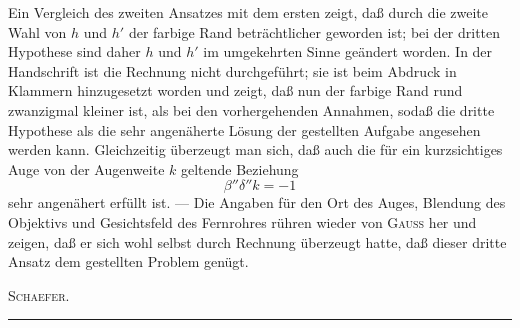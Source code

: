 Ein Vergleich des zweiten Ansatzes mit dem ersten zeigt, daß durch die zweite Wahl von $h$ und $h'$ der farbige Rand beträchtlicher geworden ist; bei der dritten Hypothese sind daher $h$ und $h'$ im umgekehrten Sinne geändert worden. In der Handschrift ist die Rechnung nicht durchgeführt; sie ist beim Abdruck in Klammern hinzugesetzt worden und zeigt, daß nun der farbige Rand rund zwanzigmal kleiner ist, als bei den vorhergehenden Annahmen, sodaß die dritte Hypothese als die sehr angenäherte Lösung der gestellten Aufgabe angesehen werden kann. Gleichzeitig überzeugt man sich, daß auch die für ein kurzsichtiges Auge von der Augenweite $k$ geltende Beziehung
\[
\beta''\delta''k=-1
\]
\noindent sehr angenähert erfüllt ist. — Die Angaben für den Ort des Auges, Blendung des Objektivs und Gesichtsfeld des Fernrohres rühren wieder von \textsc{Gauss} her und zeigen, daß er sich wohl selbst durch Rechnung überzeugt hatte, daß dieser dritte Ansatz dem gestellten Problem genügt.
\begin{flushright}\textsc{Schaefer.}\end{flushright}
\begin{center}\rule{.25\linewidth}{.4pt}\end{center}
\clearpage\endgroup
